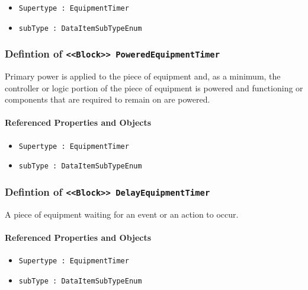\begin{itemize}
\item \texttt{Supertype : EquipmentTimer}

\item \texttt{subType : DataItemSubTypeEnum}

\end{itemize}
\FloatBarrier
\subsubsection{Defintion of \texttt{<<Block>> PoweredEquipmentTimer}}
  \label{type:PoweredEquipmentTimer}

\FloatBarrier

Primary  power is  applied  to the  piece  of  equipment and,  as  a minimum, the controller or logic portion of the piece of equipment is powered and functioning or components that are required to remain on are powered.

\FloatBarrier
\paragraph{Referenced Properties and Objects}

\begin{itemize}
\item \texttt{Supertype : EquipmentTimer}

\item \texttt{subType : DataItemSubTypeEnum}

\end{itemize}
\FloatBarrier
\subsubsection{Defintion of \texttt{<<Block>> DelayEquipmentTimer}}
  \label{type:DelayEquipmentTimer}

\FloatBarrier

A piece of equipment waiting for an event or an action to occur.

\FloatBarrier
\paragraph{Referenced Properties and Objects}

\begin{itemize}
\item \texttt{Supertype : EquipmentTimer}

\item \texttt{subType : DataItemSubTypeEnum}

\end{itemize}
\FloatBarrier
